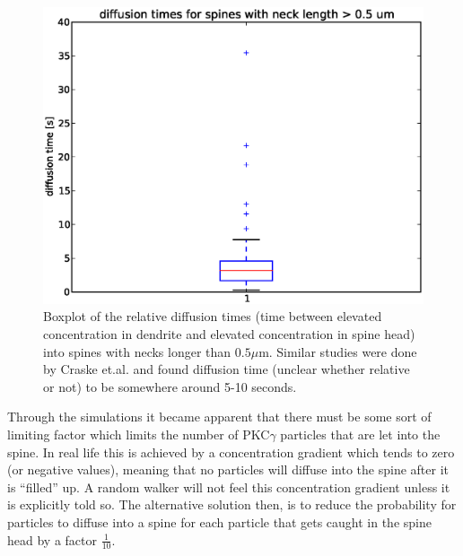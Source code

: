 \begin{figure}[h]
 \centering
 \includegraphics[scale=0.5]{Figures/spine_stats_boxplot_reltime_longneck.eps}
 \caption[Diffusion time for long necked spines]{Boxplot of the relative diffusion times (time between elevated concentration in dendrite and elevated concentration in spine head) into spines with necks longer than $0.5\mu$m. Similar studies were done by Craske et.al. \cite{craske2005spines} and found diffusion time (unclear whether relative or not) to be somewhere around 5-10 seconds.}
 \label{results:boxplot_relative_diffusiontime_long_neck}
\end{figure}

Through the simulations it became apparent that there must be some sort of limiting factor which limits the number of PKC$\gamma$ particles that are let into the spine. 
In real life this is achieved by a concentration gradient which tends to zero (or negative values), meaning that no particles will diffuse into the spine after it is ``filled'' up. 
A random walker will not feel this concentration gradient unless it is explicitly told so. 
The alternative solution then, is to reduce the probability for particles to diffuse into a spine for each particle that gets caught in the spine head by a factor $\frac{1}{10}$. 